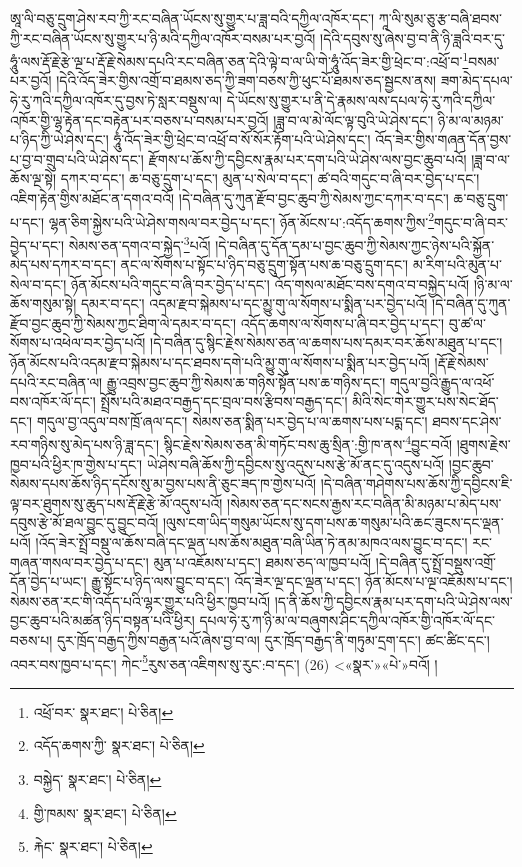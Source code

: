 ཨཱ་ལི་བཅུ་དྲུག་ཤེས་རབ་ཀྱི་རང་བཞིན་ཡོངས་སུ་གྱུར་པ་ཟླ་བའི་དཀྱིལ་འཁོར་དང་། ཀཱ་ལི་སུམ་ཅུ་རྩ་བཞི་ཐབས་ཀྱི་རང་བཞིན་ཡོངས་སུ་གྱུར་པ་ཉི་མའི་དཀྱིལ་འཁོར་བསམ་པར་བྱའོ། །དེའི་དབུས་སུ་ཞེས་བྱ་བ་ནི་ཉི་ཟླའི་བར་དུ་ཧཱུཾ་ལས་རྡོ་རྗེ་རྩེ་ལྔ་པ་རྡོ་རྗེ་སེམས་དཔའི་རང་བཞིན་ཅན་དེའི་ལྟེ་བ་ལ་ཡི་གེ་ཧཱུཾ་འོད་ཟེར་གྱི་ཕྲེང་བ་:འཕྲོ་བ་\footnote{འཕྲོ་བར་  སྣར་ཐང་།  པེ་ཅིན། }བསམ་པར་བྱའོ། །དེའི་འོད་ཟེར་གྱིས་འགྲོ་བ་ཐམས་ཅད་ཀྱི་ཟག་བཅས་ཀྱི་ཕུང་པོ་ཐམས་ཅད་སྦྱངས་ནས། ཟག་མེད་དཔལ་ཧེ་རུ་ཀའི་དཀྱིལ་འཁོར་དུ་བྱས་ཏེ་སླར་བསྡུས་ལ། དེ་ཡོངས་སུ་གྱུར་པ་ནི་དེ་རྣམས་ལས་དཔལ་ཧེ་རུ་ཀའི་དཀྱིལ་འཁོར་གྱི་ལྷ་རྟེན་དང་བརྟེན་པར་བཅས་པ་བསམ་པར་བྱའོ། །ཟླ་བ་ལ་མེ་ལོང་ལྟ་བུའི་ཡེ་ཤེས་དང་། ཉི་མ་ལ་མཉམ་པ་ཉིད་ཀྱི་ཡེ་ཤེས་དང་། ཧཱུཾ་འོད་ཟེར་གྱི་ཕྲེང་བ་འཕྲོ་བ་སོ་སོར་རྟོག་པའི་ཡེ་ཤེས་དང་། འོད་ཟེར་གྱིས་གཞན་དོན་བྱས་པ་བྱ་བ་གྲུབ་པའི་ཡེ་ཤེས་དང་། རྫོགས་པ་ཆོས་ཀྱི་དབྱིངས་རྣམ་པར་དག་པའི་ཡེ་ཤེས་ལས་བྱང་ཆུབ་པའོ། །ཟླ་བ་ལ་ཆོས་ལྔ་སྟེ། དཀར་བ་དང་། ཆ་བཅུ་དྲུག་པ་དང་། མུན་པ་སེལ་བ་དང་། ཚ་བའི་གདུང་བ་ཞི་བར་བྱེད་པ་དང་། འཇིག་རྟེན་གྱིས་མཐོང་ན་དགའ་བའོ། །དེ་བཞིན་དུ་ཀུན་རྫོབ་བྱང་ཆུབ་ཀྱི་སེམས་ཀྱང་དཀར་བ་དང་། ཆ་བཅུ་དྲུག་པ་དང་། ལྷན་ཅིག་སྐྱེས་པའི་ཡེ་ཤེས་གསལ་བར་བྱེད་པ་དང་། ཉོན་མོངས་པ་:འདོད་ཆགས་ཀྱིས་\footnote{འདོད་ཆགས་ཀྱི་  སྣར་ཐང་།  པེ་ཅིན། }གདུང་བ་ཞི་བར་བྱེད་པ་དང་། སེམས་ཅན་དགའ་བ་སྐྱེད་\footnote{བསྐྱེད་  སྣར་ཐང་།  པེ་ཅིན། }པའོ། །དེ་བཞིན་དུ་དོན་དམ་པ་བྱང་ཆུབ་ཀྱི་སེམས་ཀྱང་ཉེས་པའི་སྐྱོན་མེད་པས་དཀར་བ་དང་། ནང་ལ་སོགས་པ་སྟོང་པ་ཉིད་བཅུ་དྲུག་སྟོན་པས་ཆ་བཅུ་དྲུག་དང་། མ་རིག་པའི་མུན་པ་སེལ་བ་དང་། ཉོན་མོངས་པའི་གདུང་བ་ཞི་བར་བྱེད་པ་དང་། འོད་གསལ་མཐོང་བས་དགའ་བ་བསྐྱེད་པའོ། །ཉི་མ་ལ་ཆོས་གསུམ་སྟེ། དམར་བ་དང་། འདམ་རྫབ་སྐེམས་པ་དང་མྱུ་གུ་ལ་སོགས་པ་སྨིན་པར་བྱེད་པའོ། །དེ་བཞིན་དུ་ཀུན་རྫོབ་བྱང་ཆུབ་ཀྱི་སེམས་ཀྱང་ཐིག་ལེ་དམར་བ་དང་། འདོད་ཆགས་ལ་སོགས་པ་ཞི་བར་བྱེད་པ་དང་། བུ་ཚ་ལ་སོགས་པ་འཕེལ་བར་བྱེད་པའོ། །དེ་བཞིན་དུ་སྙིང་རྗེས་སེམས་ཅན་ལ་ཆགས་པས་དམར་བར་ཆོས་མཐུན་པ་དང་། ཉོན་མོངས་པའི་འདམ་རྫབ་སྐེམས་པ་དང་ཐབས་དགེ་པའི་མྱུ་གུ་ལ་སོགས་པ་སྨིན་པར་བྱེད་པའོ། །རྡོ་རྗེ་སེམས་དཔའི་རང་བཞིན་ལ། རྒྱུ་འབྲས་བྱང་ཆུབ་ཀྱི་སེམས་ཆ་གཉིས་སྟོན་པས་ཆ་གཉིས་དང་། གདུལ་བྱའི་རྒྱུད་ལ་འཕོ་བས་འཁོར་ལོ་དང་། སྤྲོས་པའི་མཐའ་བརྒྱད་དང་བྲལ་བས་རྩིབས་བརྒྱད་དང་། མིའི་སེང་གེར་གྱུར་པས་སེང་ཐོད་དང་། གདུལ་བྱ་འདུལ་བས་ཁྲོ་ཞལ་དང་། སེམས་ཅན་སྨིན་པར་བྱེད་པ་ལ་ཆགས་པས་པདྨ་དང་། ཐབས་དང་ཤེས་རབ་གཉིས་སུ་མེད་པས་ཉི་ཟླ་དང་། སྙིང་རྗེས་སེམས་ཅན་མི་གཏོང་བས་ཆུ་སྲིན་:གྱི་ཁ་ནས་\footnote{གྱི་ཁམས་  སྣར་ཐང་།  པེ་ཅིན། }བྱུང་བའོ། །ཐུགས་རྗེས་ཁྱབ་པའི་ཕྱིར་ཁ་གྱེས་པ་དང་། ཡེ་ཤེས་བཞི་ཆོས་ཀྱི་དབྱིངས་སུ་འདུས་པས་རྩེ་མོ་ནང་དུ་འདུས་པའོ། །བྱང་ཆུབ་སེམས་དཔས་ཆོས་ཉིད་དངོས་སུ་མ་བྱས་པས་ནི་ཅུང་ཟད་ཁ་གྱེས་པའོ། །དེ་བཞིན་གཤེགས་པས་ཆོས་ཀྱི་དབྱིངས་ཇི་ལྟ་བར་ཐུགས་སུ་ཆུད་པས་རྡོ་རྗེ་རྩེ་མོ་འདུས་པའོ། །སེམས་ཅན་དང་སངས་རྒྱས་རང་བཞིན་མི་མཉམ་པ་མེད་པས་དབུས་རྩེ་མོ་ཐལ་བྱུང་དུ་བྱུང་བའོ། །ལུས་ངག་ཡིད་གསུམ་ཡོངས་སུ་དག་པས་ཆ་གསུམ་པའི་ཆང་ཟུངས་དང་ལྡན་པའོ། །འོད་ཟེར་སྤྲོ་བསྡུ་ལ་ཆོས་བཞི་དང་ལྡན་པས་ཆོས་མཐུན་བཞི་ཡིན་ཏེ་ནམ་མཁའ་ལས་བྱུང་བ་དང་། རང་གཞན་གསལ་བར་བྱེད་པ་དང་། མུན་པ་འཇོམས་པ་དང་། ཐམས་ཅད་ལ་ཁྱབ་པའོ། །དེ་བཞིན་དུ་སྤྲོ་བསྡུས་འགྲོ་དོན་བྱེད་པ་ཡང་། རྒྱུ་སྟོང་པ་ཉིད་ལས་བྱུང་བ་དང་། འོད་ཟེར་ལྔ་དང་ལྡན་པ་དང་། ཉོན་མོངས་པ་ལྔ་འཇོམས་པ་དང་། སེམས་ཅན་རང་གི་འདོད་པའི་ལྷར་གྱུར་པའི་ཕྱིར་ཁྱབ་པའོ། །ད་ནི་ཆོས་ཀྱི་དབྱིངས་རྣམ་པར་དག་པའི་ཡེ་ཤེས་ལས་བྱང་ཆུབ་པའི་མཚན་ཉིད་བསྟན་པའི་ཕྱིར། དཔལ་ཧེ་རུ་ཀ་ཉི་མ་ལ་བཞུགས་ཤིང་དཀྱིལ་འཁོར་གྱི་འཁོར་ལོ་དང་བཅས་པ། དུར་ཁྲོད་བརྒྱད་ཀྱིས་བརྒྱན་པའོ་ཞེས་བྱ་བ་ལ། དུར་ཁྲོད་བརྒྱད་ནི་གཏུམ་དྲག་དང་། ཚང་ཚིང་དང་། འབར་བས་ཁྱབ་པ་དང་། ཀེང་\footnote{རྐེང་  སྣར་ཐང་།  པེ་ཅིན། }རུས་ཅན་འཇིགས་སུ་རུང་:བ་དང་། (26) <«སྣར་»«པེ་»བའོ། །
